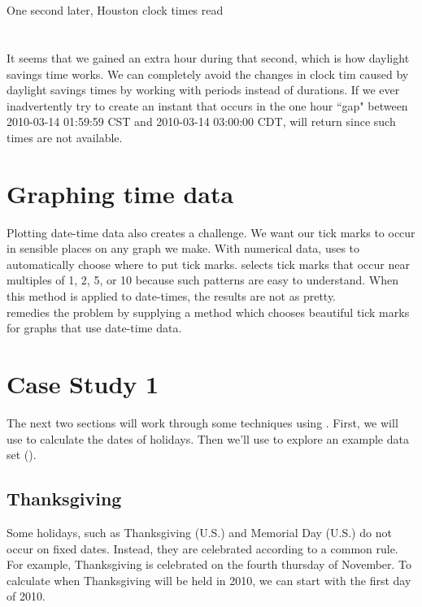 \documentclass[article]{jss}
\begin{document}
\\
\\

One second later, Houston clock times read\\

\\
\\

It seems that we gained an extra hour during that second, which is how daylight savings time works. We can completely avoid the changes in clock tim caused by daylight savings times by working with periods instead of durations. If we ever inadvertently try to create an instant that occurs in the one hour ``gap" between 2010-03-14 01:59:59 CST  and 2010-03-14 03:00:00 CDT,  will return  since such times are not available.

\section{Graphing time data}
\label{sec:pretty}

Plotting date-time data also creates a challenge. We want our tick marks to occur in sensible places on any graph we make. With numerical data,  uses  to automatically choose where to put tick marks.  selects tick marks that occur near multiples of 1, 2, 5, or 10 because such patterns are easy to understand. When this method is applied to date-times, the results are not as pretty.\\

 remedies the problem by supplying a  method which chooses beautiful tick marks for graphs that use date-time data. 

\section{Case Study 1}

The next two sections will work through some techniques using . First, we will use  to calculate the dates of  holidays. Then we'll use  to explore an example data set ().

\subsection{Thanksgiving}
Some holidays, such as Thanksgiving (U.S.) and Memorial Day (U.S.) do not occur on fixed dates. Instead, they are celebrated according to a common rule. For example, Thanksgiving is celebrated on the fourth thursday of November. To calculate when Thanksgiving will be held in 2010, we can start with the first day of 2010.\\
\end{document}
